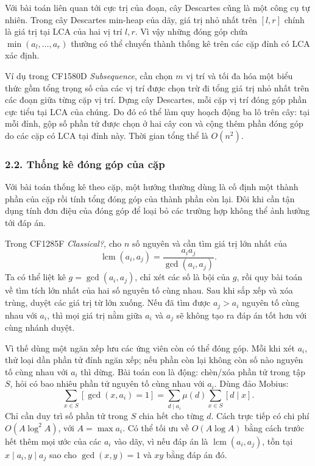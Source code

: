 \documentclass[11pt]{article}
\begin{document}
Với bài toán liên quan tới cực trị của đoạn, cây Descartes cũng là một công cụ
tự nhiên. Trong cây Descartes min-heap của dãy, giá trị nhỏ nhất trên
\([l,r]\) chính là giá trị tại LCA của hai vị trí \(l,r\). Vì vậy những đóng
góp chứa \(\min(a_l,\ldots,a_r)\) thường có thể chuyển thành thống kê trên các
cặp đỉnh có LCA xác định.

Ví dụ trong CF1580D \emph{Subsequence}, cần chọn \(m\) vị trí và tối đa hóa một
biểu thức gồm tổng trọng số của các vị trí được chọn trừ đi tổng giá trị nhỏ
nhất trên các đoạn giữa từng cặp vị trí. Dựng cây Descartes, mỗi cặp vị trí
đóng góp phần cực tiểu tại LCA của chúng. Do đó có thể làm quy hoạch động ba
lô trên cây: tại mỗi đỉnh, gộp số phần tử được chọn ở hai cây con và cộng thêm
phần đóng góp do các cặp có LCA tại đỉnh này. Thời gian tổng thể là
\(O(n^2)\).

\subsubsection*{2.2. Thống kê đóng góp của cặp}

Với bài toán thống kê theo cặp, một hướng thường dùng là cố định một thành phần
của cặp rồi tính tổng đóng góp của thành phần còn lại. Đôi khi cần tận dụng
tính đơn điệu của đóng góp để loại bỏ các trường hợp không thể ảnh hưởng tới
đáp án.

Trong CF1285F \emph{Classical?}, cho \(n\) số nguyên và cần tìm giá trị lớn
nhất của
\[
  \operatorname{lcm}(a_i,a_j)
  =\frac{a_i a_j}{\gcd(a_i,a_j)}.
\]
Ta có thể liệt kê \(g=\gcd(a_i,a_j)\), chỉ xét các số là bội của \(g\), rồi
quy bài toán về tìm tích lớn nhất của hai số nguyên tố cùng nhau. Sau khi sắp
xếp và xóa trùng, duyệt các giá trị từ lớn xuống. Nếu đã tìm được
\(a_j>a_i\) nguyên tố cùng nhau với \(a_i\), thì mọi giá trị nằm giữa \(a_i\)
và \(a_j\) sẽ không tạo ra đáp án tốt hơn với cùng nhánh duyệt.

Vì thế dùng một ngăn xếp lưu các ứng viên còn có thể đóng góp. Mỗi khi xét
\(a_i\), thử loại dần phần tử đỉnh ngăn xếp; nếu phần còn lại không còn số nào
nguyên tố cùng nhau với \(a_i\) thì dừng. Bài toán con là động: chèn/xóa phần
tử trong tập \(S\), hỏi có bao nhiêu phần tử nguyên tố cùng nhau với \(a_i\).
Dùng đảo Mobius:
\[
  \sum_{x\in S}[\gcd(x,a_i)=1]
  =\sum_{d\mid a_i}\mu(d)\sum_{x\in S}[d\mid x].
\]
Chỉ cần duy trì số phần tử trong \(S\) chia hết cho từng \(d\). Cách trực tiếp
có chi phí \(O(A\log^2 A)\), với \(A=\max a_i\). Có thể tối ưu về
\(O(A\log A)\) bằng cách trước hết thêm mọi ước của các \(a_i\) vào dãy, vì
nếu đáp án là \(\operatorname{lcm}(a_i,a_j)\), tồn tại
\(x\mid a_i,y\mid a_j\) sao cho \(\gcd(x,y)=1\) và \(xy\) bằng đáp án đó.
\end{document}

